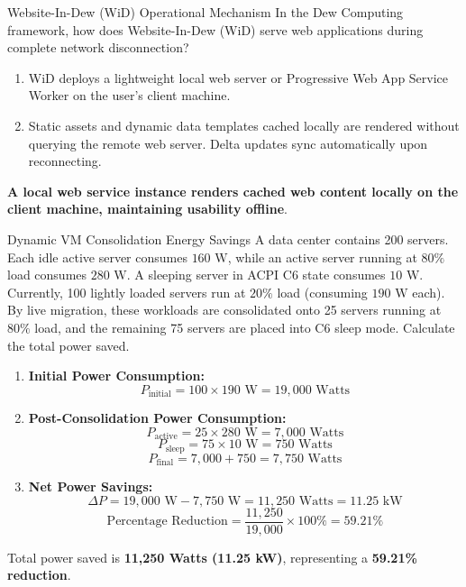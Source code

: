 \begin{solved}{Website-In-Dew (WiD) Operational Mechanism}
\Given In the Dew Computing framework, how does Website-In-Dew (WiD) serve web applications during complete network disconnection?
\Steps
\begin{enumerate}[leftmargin=*]
  \item WiD deploys a lightweight local web server or Progressive Web App Service Worker on the user's client machine.
  \item Static assets and dynamic data templates cached locally are rendered without querying the remote web server. Delta updates sync automatically upon reconnecting.
\end{enumerate}
\Answer \textbf{A local web service instance renders cached web content locally on the client machine, maintaining usability offline}.
\end{solved}

\begin{solved}{Dynamic VM Consolidation Energy Savings}
\Given A data center contains 200 servers. Each idle active server consumes $160\text{ W}$, while an active server running at $80\%$ load consumes $280\text{ W}$. A sleeping server in ACPI C6 state consumes $10\text{ W}$. Currently, 100 lightly loaded servers run at $20\%$ load (consuming $190\text{ W}$ each). By live migration, these workloads are consolidated onto 25 servers running at $80\%$ load, and the remaining 75 servers are placed into C6 sleep mode. Calculate the total power saved.
\Steps
\begin{enumerate}[leftmargin=*]
  \item \textbf{Initial Power Consumption:}
  \begin{equation}
  P_{\text{initial}} = 100 \times 190\text{ W} = 19,000\text{ Watts}
  \end{equation}
  \item \textbf{Post-Consolidation Power Consumption:}
  \begin{equation}
  P_{\text{active}} = 25 \times 280\text{ W} = 7,000\text{ Watts}
  \end{equation}
  \begin{equation}
  P_{\text{sleep}} = 75 \times 10\text{ W} = 750\text{ Watts}
  \end{equation}
  \begin{equation}
  P_{\text{final}} = 7,000 + 750 = 7,750\text{ Watts}
  \end{equation}
  \item \textbf{Net Power Savings:}
  \begin{equation}
  \Delta P = 19,000\text{ W} - 7,750\text{ W} = 11,250\text{ Watts} = 11.25\text{ kW}
  \end{equation}
  \begin{equation}
  \text{Percentage Reduction} = \frac{11,250}{19,000} \times 100\% = 59.21\%
  \end{equation}
\end{enumerate}
\Answer Total power saved is \textbf{11,250 Watts (11.25 kW)}, representing a \textbf{59.21\% reduction}.
\end{solved}
